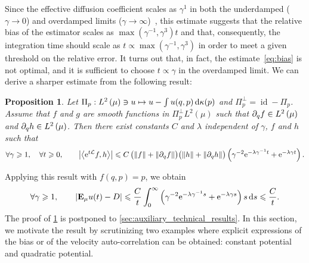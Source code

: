 \documentclass[11pt,a4paper]{article}
\DeclareMathOperator{\id}{id}
\newcommand{\e}{\mathrm{e}}
\newcommand{\expect}[0]{\mathbf{E}}
\renewcommand{\d}{\mathrm d}
\theoremstyle{plain}
\newtheorem{proposition}{Proposition}[section]
\numberwithin{equation}{section}
\renewcommand{\leq}{\leqslant}
\renewcommand{\geq}{\geqslant}
\begin{document}
Since the effective diffusion coefficient scales as $\gamma^1$ in both the underdamped ($\gamma \to 0$) and overdamped limits ($\gamma \to \infty$)~\cite{MR2394704,MR2427108},
this estimate suggests that the relative bias of the estimator scales as $\max(\gamma^{-1}, \gamma^3) t$ and that,
consequently, the integration time should scale as $t \propto \max(\gamma^{-1}, \gamma^3)$ in order to meet a given threshold on the relative error.
It turns out that, in fact, the estimate~\eqref{eq:bias} is not optimal,
and it is sufficient to choose $t \propto \gamma$ in the overdamped limit.
We can derive a sharper estimate from the following result:
\begin{proposition}
    \label{proposition:semigroup_meanzero_observable}
    Let $\Pi_p: \lp{2}{\mu} \ni u \mapsto  u - \int u(q, p) \, \d \kappa(p)$ and $\Pi_p^\perp = \id - \Pi_p$.
    Assume that $f$ and $g$ are smooth functions in $\Pi_p^\perp L^2(\mu)$
    such that $\partial_q f \in \lp{2}{\mu}$ and $\partial_q h \in \lp{2}{\mu}$.
    Then there exist constants $C$ and $\lambda$ independent of $\gamma$, $f$ and $h$ such that
    \begin{equation}
        \label{eq:optimal_decay_correlation}
        \forall \gamma \geq 1, \quad
        \forall t \geq 0, \qquad
        \abs{\ip{\e^{t \mathcal L}f}{h}}
        \leq C \, \bigl( \norm{f} + \norm{\partial_q f} \bigr) \bigl( \norm{h} + \norm{\partial_q h} \bigr)  \left( \gamma^{-2} \e^{- \lambda \gamma^{-1} t} + \e^{-\lambda  \gamma t} \right).
    \end{equation}
\end{proposition}
Applying this result with $f(q, p) = p$, we obtain
\begin{equation*}
    \forall \gamma \geq 1, \qquad
    \abs{\expect_{\mu} u(t) - D}
    \leq \frac{C}{t}\int_{0}^{\infty} \left( \gamma^{-2} \e^{- \lambda \gamma^{-1} s} + \e^{-\lambda  \gamma s} \right)  s \, \d s
    \leq \frac{C}{t}.
\end{equation*}
The proof of \cref{proposition:semigroup_meanzero_observable} is postponed to \cref{sec:auxiliary_technical_results}.
In this section,
we motivate the result by scrutinizing two examples where
explicit expressions of the bias or of the velocity auto-correlation can be obtained:
constant potential and quadratic potential.
\end{document}
